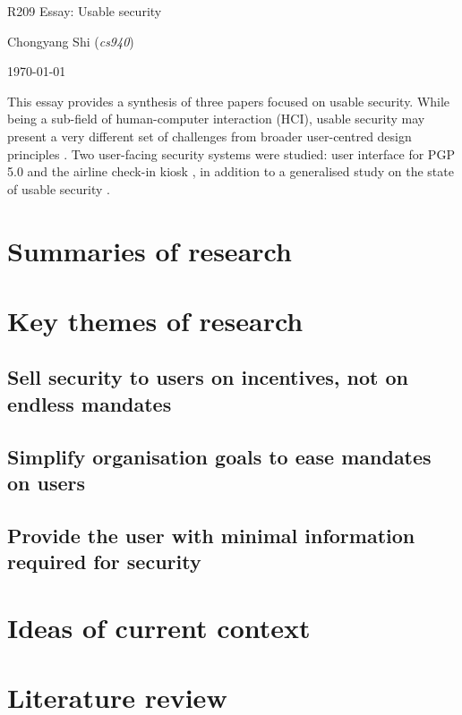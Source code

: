 \documentclass[11pt]{article}
\begin{document}
\centerline{\Large R209 Essay:  Usable security}
\vspace{2em}
\centerline{\large Chongyang Shi (\emph{cs940})}
\vspace{1em}
\centerline{\large \today}
\vspace{1em}

This essay provides a synthesis of three papers focused on usable security. While being a sub-field of human-computer interaction (HCI), usable security may present a very different set of challenges from broader user-centred design principles \cite[Abs.]{whitten1999johnny}. Two user-facing security systems were studied: user interface for PGP 5.0 \cite{whitten1999johnny} and the airline check-in kiosk \cite{glass2016usability}, in addition to a generalised study on the state of usable security \cite{herley2014more}.

\section{Summaries of research}

\section{Key themes of research}

\subsection{Sell security to users on incentives, not on endless mandates}

\subsection{Simplify organisation goals to ease mandates on users}

\subsection{Provide the user with minimal information required for security}

\section{Ideas of current context}

\section{Literature review}



\footnotesize{}
\end{document}
